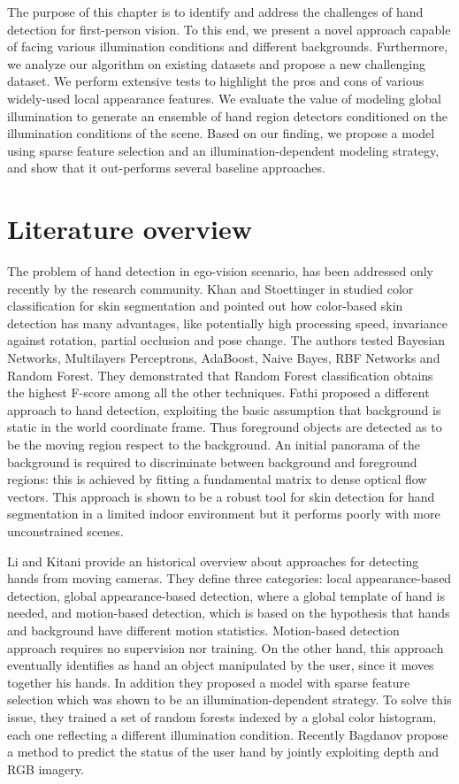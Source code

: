 The purpose of this chapter is to identify and address the
challenges of hand detection for first-person vision. To this
end, we present a novel approach capable of facing
various illumination conditions and different backgrounds. Furthermore, we analyze our algorithm on existing datasets and propose a new challenging dataset. We perform extensive tests to highlight the pros and
cons of various widely-used local appearance features. We
evaluate the value of modeling global illumination to generate
an ensemble of hand region detectors conditioned on the
illumination conditions of the scene. Based on our finding,
we propose a model using sparse feature selection and an
illumination-dependent modeling strategy, and show that it
out-performs several baseline approaches.

\section{Literature overview}
The problem of hand detection  in ego-vision scenario, has been addressed only recently by the research community. Khan and Stoettinger in \cite{khan10} studied color classification for skin segmentation and pointed out how color-based skin detection has many advantages, like potentially high processing speed, invariance against rotation, partial occlusion and pose change. The authors tested Bayesian Networks, Multilayers Perceptrons, AdaBoost, Naive Bayes, RBF Networks and Random Forest. They demonstrated that Random Forest classification obtains the highest F-score among all the other techniques. 
Fathi \etal \cite{fathi11} proposed a different approach to hand detection, exploiting the basic assumption that background is static in the world coordinate frame. Thus foreground objects are detected as to be the moving region respect to the background. An initial panorama of the background is required to discriminate between background and foreground regions: this is achieved by fitting a fundamental matrix to dense optical flow vectors. 
This approach is shown to be a robust tool for skin detection for hand segmentation in a limited indoor environment but it performs poorly with more unconstrained scenes.

Li and Kitani \cite{li13} provide an historical overview about approaches for detecting hands from moving cameras. They define three categories: local appearance-based detection, global appearance-based detection, where a global template of hand is needed, and motion-based detection, which is based on the hypothesis that hands and background have different motion statistics. Motion-based detection approach requires no supervision nor training. On the other hand, this approach eventually identifies as hand an object manipulated by the user, since it moves together his hands. In addition they proposed a model with sparse feature selection which was shown to be an illumination-dependent strategy. To solve this issue, they trained a set of random forests indexed by a global color histogram, each one reflecting a different illumination condition.
Recently Bagdanov \etal \cite{bagdanov12} propose a method to predict the status of the user hand by jointly exploiting depth and RGB imagery.

